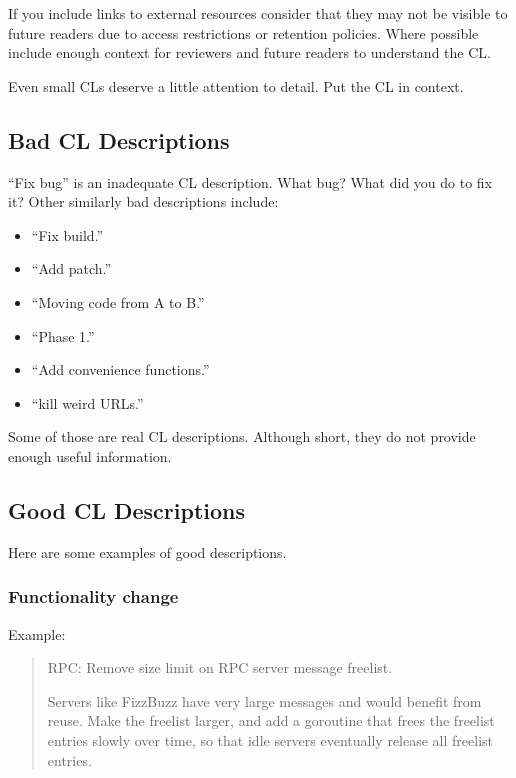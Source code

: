 \documentclass[
]{article}
\providecommand{\tightlist}{%
  \setlength{\itemsep}{0pt}\setlength{\parskip}{0pt}}
\begin{document}
If you include links to external resources consider that they may not be
visible to future readers due to access restrictions or retention
policies. Where possible include enough context for reviewers and future
readers to understand the CL.

Even small CLs deserve a little attention to detail. Put the CL in
context.

\subsection{Bad CL Descriptions}\label{bad}

``Fix bug'' is an inadequate CL description. What bug? What did you do
to fix it? Other similarly bad descriptions include:

\begin{itemize}
\tightlist
\item
  ``Fix build.''
\item
  ``Add patch.''
\item
  ``Moving code from A to B.''
\item
  ``Phase 1.''
\item
  ``Add convenience functions.''
\item
  ``kill weird URLs.''
\end{itemize}

Some of those are real CL descriptions. Although short, they do not
provide enough useful information.

\subsection{Good CL Descriptions}\label{good}

Here are some examples of good descriptions.

\subsubsection{Functionality change}\label{functionality-change}

Example:

\begin{quote}
RPC: Remove size limit on RPC server message freelist.

Servers like FizzBuzz have very large messages and would benefit from
reuse. Make the freelist larger, and add a goroutine that frees the
freelist entries slowly over time, so that idle servers eventually
release all freelist entries.
\end{quote}
\end{document}
